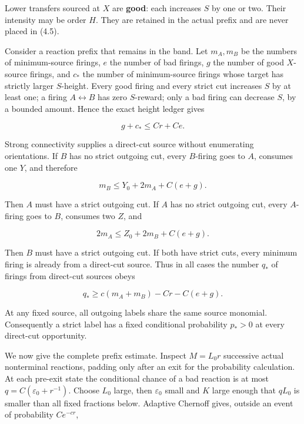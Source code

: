 Lower transfers sourced at \(X\) are \textbf{good}: each increases \(S\)
by one or two. Their intensity may be order \(H\). They are retained in
the actual prefix and are never placed in (4.5).

Consider a reaction prefix that remains in the band. Let \(m_A,m_B\) be
the numbers of minimum-source firings, \(e\) the number of bad firings,
\(g\) the number of good \(X\)-source firings, and \(c_*\) the number of
minimum-source firings whose target has strictly larger \(S\)-height.
Every good firing and every strict cut increases \(S\) by at least one;
a firing \(A\leftrightarrow
B\) has zero \(S\)-reward; only a bad firing can decrease \(S\), by a
bounded amount. Hence the exact height ledger gives

\[
                              g+c_*\le Cr+Ce.          \tag{4.6}
\]

Strong connectivity supplies a direct-cut source without enumerating
orientations. If \(B\) has no strict outgoing cut, every \(B\)-firing
goes to \(A\), consumes one \(Y\), and therefore

\[
                              m_B\le Y_0+2m_A+C(e+g).  \tag{4.7}
\]

Then \(A\) must have a strict outgoing cut. If \(A\) has no strict
outgoing cut, every \(A\)-firing goes to \(B\), consumes two \(Z\), and

\[
                              2m_A\le Z_0+2m_B+C(e+g). \tag{4.8}
\]

Then \(B\) must have a strict outgoing cut. If both have strict cuts,
every minimum firing is already from a direct-cut source. Thus in all
cases the number \(q_*\) of firings from direct-cut sources obeys

\[
 q_*\ge c(m_A+m_B)-Cr-C(e+g).                         \tag{4.9}
\]

At any fixed source, all outgoing labels share the same source monomial.
Consequently a strict label has a fixed conditional probability
\(p_*>0\) at every direct-cut opportunity.

We now give the complete prefix estimate. Inspect \(M=L_0r\) successive
actual nonterminal reactions, padding only after an exit for the
probability calculation. At each pre-exit state the conditional chance
of a bad reaction is at most \(q=C(\varepsilon_0+r^{-1})\). Choose
\(L_0\) large, then \(\varepsilon_0\) small and \(K\) large enough that
\(qL_0\) is smaller than all fixed fractions below. Adaptive Chernoff
gives, outside an event of probability \(Ce^{-cr}\),

